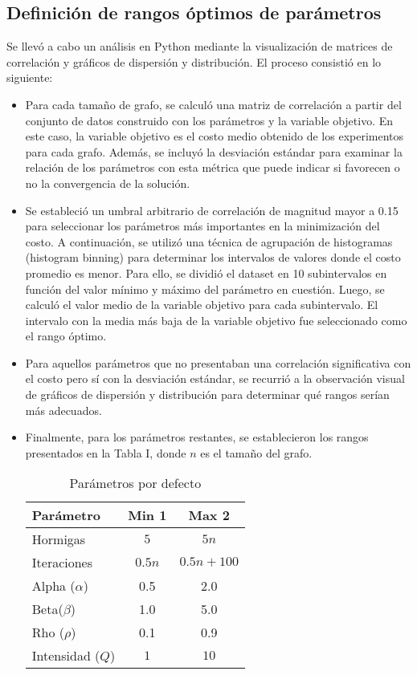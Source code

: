 \documentclass[conference]{IEEEtran}
\begin{document}
\subsection{Definición de rangos óptimos de parámetros}
Se llevó a cabo un análisis en Python mediante la visualización de matrices de correlación y gráficos de dispersión y distribución. El proceso consistió en lo siguiente:
\begin{itemize}
\item Para cada tamaño de grafo, se calculó una matriz de correlación a partir del conjunto de datos construido con los parámetros y la variable objetivo. En este caso, la variable objetivo es el costo medio obtenido de los experimentos para cada grafo. Además, se incluyó la desviación estándar para examinar la relación de los parámetros con esta métrica que puede indicar si favorecen o no la convergencia de la solución.
\item Se estableció un umbral arbitrario de correlación de magnitud mayor a 0.15 para seleccionar los parámetros más importantes en la minimización del costo. A continuación, se utilizó una técnica de agrupación de histogramas (histogram binning) \cite{data_binning_wiki} para determinar los intervalos de valores donde el costo promedio es menor. Para ello, se dividió el dataset en 10 subintervalos en función del valor mínimo y máximo del parámetro en cuestión. Luego, se calculó el valor medio de la variable objetivo para cada subintervalo. El intervalo con la media más baja de la variable objetivo fue seleccionado como el rango óptimo.
\item Para aquellos parámetros que no presentaban una correlación significativa con el costo pero sí con la desviación estándar, se recurrió a la observación visual de gráficos de dispersión y distribución para determinar qué rangos serían más adecuados.
\item Finalmente, para los parámetros restantes, se establecieron los rangos presentados en la Tabla I, donde $n$ es el tamaño del grafo.

\begin{table}[h]
  \centering
  \begin{tabular}{|l|c|c|}
    \hline
    Parámetro & Min 1 & Max 2 \\
    \hline
    Hormigas & $5$ & $5n$ \\
    \hline
    Iteraciones & $0.5n$ & $0.5n + 100$ \\
    \hline
    Alpha ($\alpha$) & 0.5 & 2.0 \\
    \hline
    Beta($\beta$) & 1.0 & 5.0 \\
    \hline
    Rho ($\rho$) & 0.1 & 0.9 \\
    \hline
    Intensidad ($Q$) & $1$ & $10$ \\
    \hline
  \end{tabular}
  \caption{Parámetros por defecto}
  \label{tab:table1}
\end{table}
\end{itemize}
\end{document}
